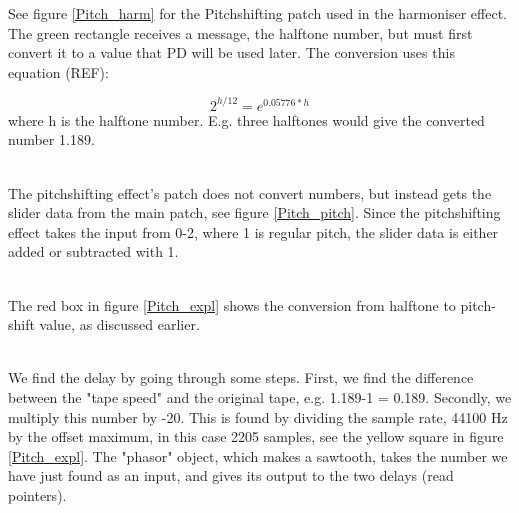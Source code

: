 See figure \ref{Pitch_harm} for the Pitchshifting patch used in the harmoniser effect. The green rectangle receives a message, the halftone number, but must first convert it to 
a value that PD will be used later. The conversion uses this equation (REF):

\[ 2^{h/12} = e^{0.05776*h} \] where h is the halftone number. E.g. three halftones would give the converted number 1.189. \\

\begin{minipage}{\linewidth}%
\label{Pitch_harm}
\end{minipage}\\

The pitchshifting effect's patch does not convert numbers, but instead gets the slider data from the main patch, see figure \ref{Pitch_pitch}. Since the pitchshifting effect takes 
the input from 0-2, where 1 is regular pitch, the slider data is either added or subtracted with 1. 

\begin{minipage}{\linewidth}%
\label{Pitch_pitch}
\end{minipage}\\

The red box in figure \ref{Pitch_expl} shows the conversion from halftone to pitch-shift value, as discussed earlier. 

\begin{minipage}{\linewidth}%
\label{Pitch_expl}
\end{minipage}\\

We find the delay by going through some steps. First, we find the difference between the "tape speed" and the original tape, e.g. 1.189-1 = 0.189. 
Secondly, we multiply this number by -20. This is found by dividing the sample rate, 44100 Hz by the offset maximum, in this case 2205 samples, see the yellow square in figure \ref{Pitch_expl}. The "phasor" object, which makes a sawtooth, takes the number we have just found as an input, and gives its output to the two delays (read pointers). 

